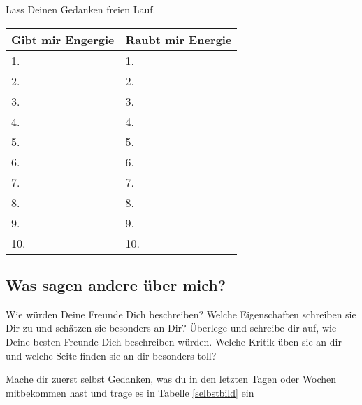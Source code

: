 \documentclass[../Lebensziel.tex]{subfiles}
\begin{document}
Lass Deinen Gedanken freien Lauf.

\begin{table}[h!]
    \centering
    \setlength{\tabcolsep}{18pt}
    \renewcommand{\arraystretch}{1.5}
    \begin{tabular}{p{5.5cm}|p{5.5cm}}
        \textbf{Gibt mir Engergie} & \textbf{Raubt mir Energie} \\\hline
        1.                         & 1.                         \\\hline
        2.                         & 2.                         \\\hline
        3.                         & 3.                         \\\hline
        4.                         & 4.                         \\\hline
        5.                         & 5.                         \\\hline
        6.                         & 6.                         \\\hline
        7.                         & 7.                         \\\hline
        8.                         & 8.                         \\\hline
        9.                         & 9.                         \\\hline
        10.                        & 10.
    \end{tabular}
    \label{energie}
\end{table}

\subsection*{Was sagen andere über mich?}
Wie würden Deine Freunde Dich beschreiben? Welche Eigenschaften schreiben sie Dir zu und schätzen sie besonders an Dir?
Überlege und schreibe dir auf, wie Deine besten Freunde Dich beschreiben würden. Welche Kritik üben sie an dir und welche Seite finden sie an dir besonders toll?

Mache dir zuerst selbst Gedanken, was du in den letzten Tagen oder Wochen mitbekommen hast und trage es in Tabelle \ref{selbstbild} ein
\end{document}
